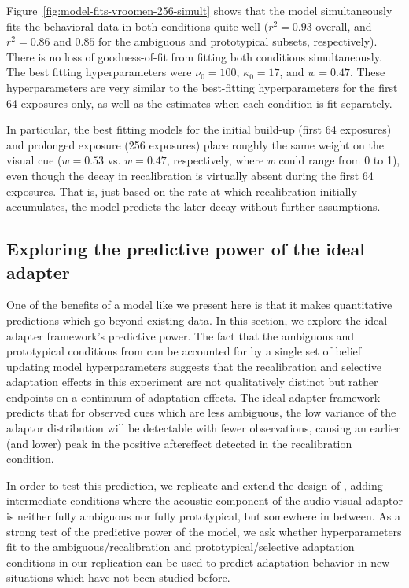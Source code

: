 Figure~\ref{fig:model-fits-vroomen-256-simult} shows that the model simultaneously fits the behavioral data in both conditions quite well ($r^2=0.93$ overall, and $r^2=0.86$ and $0.85$ for the ambiguous and prototypical subsets, respectively).  There is no loss of goodness-of-fit from fitting both conditions simultaneously.  The best fitting hyperparameters were $\nu_0 = 100$, $\kappa_0=17$, and $w=0.47$.  These hyperparameters are very similar to the best-fitting hyperparameters for the first 64 exposures only, as well as the estimates when each condition is fit separately.

In particular, the best fitting models for the initial build-up (first 64 exposures) and prolonged exposure (256 exposures) place roughly the same weight on the visual cue ($w=0.53$ vs. $w=0.47$, respectively, where $w$ could range from 0 to 1), even though the decay in recalibration is virtually absent during the first 64 exposures. That is, just based on the rate at which recalibration initially accumulates, the model predicts the later decay without further assumptions.


\subsection{Exploring the predictive power of the ideal adapter}
\label{sec:expl-pred-power}

One of the benefits of a model like we present here is that it makes quantitative predictions which go beyond existing data.  In this section, we explore the ideal adapter framework's predictive power.  The fact that the ambiguous and prototypical conditions from \textcite{Vroomen2007} can be accounted for by a single set of belief updating model hyperparameters suggests that the recalibration and selective adaptation effects in this experiment are not qualitatively distinct but rather endpoints on a continuum of adaptation effects.  The ideal adapter framework predicts that for observed cues which are less ambiguous, the low variance of the adaptor distribution will be detectable with fewer observations, causing an earlier (and lower) peak in the positive aftereffect detected in the recalibration condition.


In order to test this prediction, we replicate and extend the design of \textcite{Vroomen2007}, adding intermediate conditions where the acoustic component of the audio-visual adaptor is neither fully ambiguous nor fully prototypical, but somewhere in between.  As a strong test of the predictive power of the model, we ask whether hyperparameters fit to the ambiguous/recalibration and prototypical/selective adaptation conditions in our replication can be used to predict adaptation behavior in new situations which have not been studied before.

